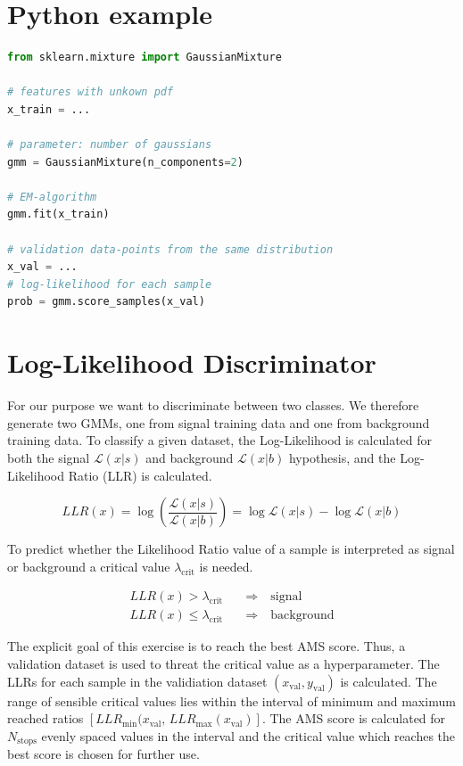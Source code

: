 \clearpage
\section{Python example}


\begin{lstlisting}[language=Python]
from sklearn.mixture import GaussianMixture

# features with unkown pdf
x_train = ... 

# parameter: number of gaussians
gmm = GaussianMixture(n_components=2) 

# EM-algorithm 
gmm.fit(x_train) 

# validation data-points from the same distribution
x_val = ... 
# log-likelihood for each sample
prob = gmm.score_samples(x_val) 
\end{lstlisting}


\section{Log-Likelihood Discriminator}

For our purpose we want to discriminate between two classes. 
We therefore generate two GMMs, one from signal training data and one from background training data. To classify a given dataset, the Log-Likelihood is calculated for both the signal $\mathcal{L}(x|s)$ and background $\mathcal{L}(x|b)$ hypothesis, and the Log-Likelihood Ratio (LLR) is calculated.

$$
LLR(x) = \log \left(\frac{\mathcal{L}(x|s)}{\mathcal{L}(x|b)}\right) = \log \mathcal{L}(x|s) - \log \mathcal{L}(x|b)
$$

To predict whether the Likelihood Ratio value of a sample is interpreted as signal or background a critical value $\lambda_{\text{crit}}$ is needed. 


\begin{align*}
LLR(x) > \lambda_{\text{crit}} \quad &\Rightarrow \quad \text{signal} \\
LLR(x) \le \lambda_{\text{crit}} \quad &\Rightarrow \quad \text{background}
\end{align*}


The explicit goal of this exercise is to reach the best AMS score. Thus, a validation dataset is used to threat the critical value as a hyperparameter. The LLRs for each sample in the validiation dataset $(x_{\text{val}},y_{\text{val}} )$ is calculated. The range of sensible critical values lies within the interval of minimum and maximum reached ratios $[LLR_{\min}(x_\text{val},\,LLR_{\max}(x_\text{val} )]$. 
The AMS score is calculated for $N_\text{stops}$ evenly spaced values in the interval and the critical value  which reaches the best score is chosen for further use. 



